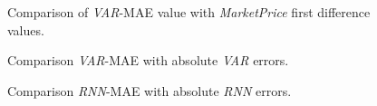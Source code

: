 \begin{figure}[bth] 
  \caption{Comparison of \textit{VAR}-MAE value with
\textit{MarketPrice} first difference values.}
  \label{fig:comparison-mae-with-diffs}
\end{figure}

\begin{figure}[bth] 
  \caption{Comparison \textit{VAR}-MAE with absolute \textit{VAR}
errors.}
  \label{fig:comparison-var-mae-with-var-absolute-error}
\end{figure}

\begin{figure}[bth] 
  \caption{Comparison \textit{RNN}-MAE with absolute \textit{RNN}
errors.}
  \label{fig:comparison-var-mae-with-var-absolute-error}
\end{figure}

